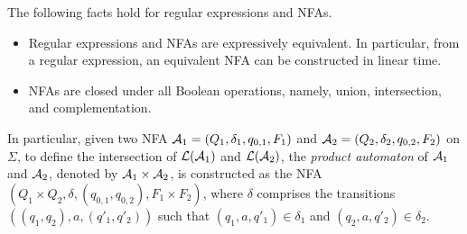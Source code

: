\begin{proposition}[\cite{HU79}]
The following facts hold for regular expressions and NFAs.
\begin{itemize}
\item Regular expressions and NFAs are expressively equivalent. In particular, from a regular expression, an equivalent NFA can be constructed in linear time.  
%
\item NFAs are closed under all Boolean operations, namely, union, intersection, and complementation.
\end{itemize}
\end{proposition}

In particular, given two NFA $\mathcal{A}_1=(Q_1, \delta_1, q_{0,1}, F_1)$ and $\mathcal{A}_2=(Q_2, \delta_2, q_{0,2}, F_2)$ on $\Sigma$, to define the intersection of $\mathcal{L}(\mathcal{A}_1)$ and $\mathcal{L}(\mathcal{A}_2)$, the \emph{product automaton} of $\mathcal{A}_1$ and $\mathcal{A}_2$, denoted by $\mathcal{A}_1 \times \mathcal{A}_2$, is constructed as the NFA $(Q_1 \times Q_2, \delta, (q_{0,1}, q_{0,2}), F_1 \times F_2)$, where $\delta$ comprises the transitions $((q_1, q_2), a, (q'_1, q'_2))$ such that $(q_1, a, q'_1) \in \delta_1$ and $(q_2, a, q'_2) \in \delta_2$.  



